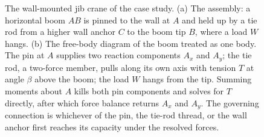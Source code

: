 \begin{figure}[htbp]
\caption[A wall-mounted jib crane and the free-body diagram of its
boom]{The wall-mounted jib crane of the case study. (a) The assembly: a
horizontal boom $AB$ is pinned to the wall at $A$ and held up by a tie
rod from a higher wall anchor $C$ to the boom tip $B$, where a load $W$
hangs. (b) The free-body diagram of the boom treated as one body. The
pin at $A$ supplies two reaction components $A_x$ and $A_y$; the tie rod,
a two-force member, pulls along its own axis with tension $T$ at angle
$\beta$ above the boom; the load $W$ hangs from the tip. Summing moments
about $A$ kills both pin components and solves for $T$ directly, after
which force balance returns $A_x$ and $A_y$. The governing connection is
whichever of the pin, the tie-rod thread, or the wall anchor first
reaches its capacity under the resolved forces.}
\label{fig:vol03ch01:jib-crane}
\end{figure}
